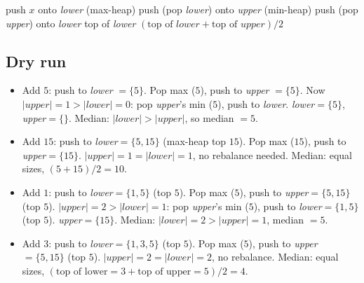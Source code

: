 \begin{algorithm}[H]
\caption{Median Maintainer (Two Heaps)}
\begin{algorithmic}[1]
  \State push $x$ onto \textit{lower} (max-heap)
  \State push (pop \textit{lower}) onto \textit{upper} (min-heap)
    \State push (pop \textit{upper}) onto \textit{lower}
  \EndIf
\EndProcedure
{}
   \Return top of \textit{lower}
  \Else \Return $(\text{top of } \textit{lower} + \text{top of } \textit{upper}) / 2$ \EndIf
\EndProcedure
\end{algorithmic}
\end{algorithm}

\subsection*{Dry run}


\begin{itemize}
  \item Add $5$: push to \textit{lower} $=\{5\}$. Pop max ($5$), push to
        \textit{upper} $=\{5\}$. Now $|\textit{upper}|=1 >
        |\textit{lower}|=0$: pop \textit{upper}'s min ($5$), push to
        \textit{lower}. \textit{lower}$=\{5\}$, \textit{upper}$=\{\}$.
        Median: $|\textit{lower}|>|\textit{upper}|$, so median $=5$.
  \item Add $15$: push to \textit{lower}$=\{5,15\}$ (max-heap top $15$).
        Pop max ($15$), push to \textit{upper}$=\{15\}$.
        $|\textit{upper}|=1=|\textit{lower}|=1$, no rebalance needed.
        Median: equal sizes, $(5+15)/2=10$.
  \item Add $1$: push to \textit{lower}$=\{1,5\}$ (top $5$). Pop max
        ($5$), push to \textit{upper}$=\{5,15\}$ (top $5$).
        $|\textit{upper}|=2>|\textit{lower}|=1$: pop \textit{upper}'s min
        ($5$), push to \textit{lower}$=\{1,5\}$ (top $5$).
        \textit{upper}$=\{15\}$. Median: $|\textit{lower}|=2>
        |\textit{upper}|=1$, median $=5$.
  \item Add $3$: push to \textit{lower}$=\{1,3,5\}$ (top $5$). Pop max
        ($5$), push to \textit{upper}$=\{5,15\}$ (top $5$).
        $|\textit{upper}|=2=|\textit{lower}|=2$, no rebalance. Median:
        equal sizes, $(\text{top of lower}=3 + \text{top of upper}=5)/2
        =4$.
\end{itemize}

